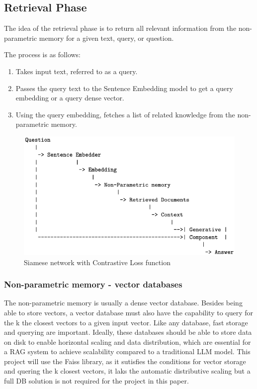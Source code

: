 \documentclass{wseas}
\begin{document}
\subsection{Retrieval Phase}

The idea of the retrieval phase is to return all relevant information
from the non-parametric memory for a given text, query, or question.

The process is as follows:

\begin{enumerate}
\def\labelenumi{\arabic{enumi}.}
\item
  Takes input text, referred to as a query.
\item
  Passes the query text to the Sentence Embedding model to get a query
  embedding or a query dense vector.
\item
  Using the query embedding, fetches a list of related knowledge from
  the non-parametric memory.
\end{enumerate}


\begin{figure}[htbp]
  \centering
  \includegraphics[width=\linewidth]{resources/v1/retrievalSystemRetreavalPhase.png} %
  \caption{Siamese network with Contrastive Loss function}
  \label{fig:retrieval_system_retreaval_phase_figure}
\end{figure}

\subsubsection{Non-parametric memory - vector databases}

The non-parametric memory is usually a dense vector database. Besides
being able to store vectors, a vector database must also have the
capability to query for the k the closest vectors to a given input
vector. Like any database, fast storage and querying are important.
Ideally, these databases should be able to store data on disk to enable
horizontal scaling and data distribution, which are essential for a RAG
system to achieve scalability compared to a traditional LLM model. This
project will use the Faiss library, as it sutisfies the conditions for
vector storage and quering the k closest vectors, it laks the automatic
distributive scaling but a full DB solution is not required for the
project in this paper.
\end{document}
